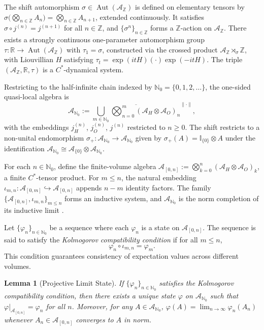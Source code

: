\documentclass[12pt,a4paper]{article}
\newtheorem{lemma}[theorem]{Lemma}
\begin{document}
The shift automorphism $\sigma \in \operatorname{Aut}(\mathcal{A}_{\mathbb{Z}})$ is defined on elementary tensors by $\sigma\big( \bigotimes_{n \in \mathbb{Z}} A_n \big) = \bigotimes_{n \in \mathbb{Z}} A_{n+1}$, extended continuously. It satisfies $\sigma \circ j^{(n)} = j^{(n+1)}$ for all $n \in \mathbb{Z}$, and $\{\sigma^n\}_{n \in \mathbb{Z}}$ forms a $\mathbb{Z}$-action on $\mathcal{A}_{\mathbb{Z}}$. There exists a strongly continuous one-parameter automorphism group $\tau: \mathbb{R} \to \operatorname{Aut}(\mathcal{A}_{\mathbb{Z}})$ with $\tau_1 = \sigma$, constructed via the crossed product $\mathcal{A}_{\mathbb{Z}} \rtimes_\sigma \mathbb{Z}$, with Liouvillian $H$ satisfying $\tau_t = \exp(i t H) (\cdot) \exp(-i t H)$. The triple $(\mathcal{A}_{\mathbb{Z}}, \mathbb{R}, \tau)$ is a $C^*$-dynamical system.

Restricting to the half-infinite chain indexed by $\mathbb{N}_0 = \{0,1,2,\dots\}$, the one-sided quasi-local algebra is
\[
\mathcal{A}_{\mathbb{N}_0} := \overline{\bigcup_{m \in \mathbb{N}_0} \bigotimes_{n=0}^m (\mathcal{A}_H \otimes \mathcal{A}_O)_n}^{\|\cdot\|},
\]
with the embeddings $j_H^{(n)}$, $j_O^{(n)}$, $j^{(n)}$ restricted to $n \ge 0$. The shift restricts to a non-unital endomorphism $\sigma_+: \mathcal{A}_{\mathbb{N}_0} \to \mathcal{A}_{\mathbb{N}_0}$ given by $\sigma_+(A) = \mathbb{I}_{\{0\}} \otimes A$ under the identification $\mathcal{A}_{\mathbb{N}_0} \cong \mathcal{A}_{\{0\}} \otimes \mathcal{A}_{\mathbb{N}_0}$.

For each $n \in \mathbb{N}_0$, define the finite-volume algebra $\mathcal{A}_{[0,n]} := \bigotimes_{k=0}^n (\mathcal{A}_H \otimes \mathcal{A}_O)_k$, a finite $C^*$-tensor product. For $m \le n$, the natural embedding $\iota_{m,n}: \mathcal{A}_{[0,m]} \hookrightarrow \mathcal{A}_{[0,n]}$ appends $n-m$ identity factors. The family $\{\mathcal{A}_{[0,n]}, \iota_{m,n}\}_{m \le n}$ forms an inductive system, and $\mathcal{A}_{\mathbb{N}_0}$ is the norm completion of its inductive limit \cite{OP87, Partha12}.

Let $\{\varphi_n\}_{n \in \mathbb{N}_0}$ be a sequence where each $\varphi_n$ is a state on $\mathcal{A}_{[0,n]}$. The sequence is said to satisfy the \textit{Kolmogorov compatibility condition} if for all $m \le n$,
\[
\varphi_n \circ \iota_{m,n} = \varphi_m.
\]
This condition guarantees consistency of expectation values across different volumes.

\begin{lemma}[Projective Limit State]
If $\{\varphi_n\}_{n \in \mathbb{N}_0}$ satisfies the Kolmogorov compatibility condition, then there exists a unique state $\varphi$ on $\mathcal{A}_{\mathbb{N}_0}$ such that $\varphi|_{\mathcal{A}_{[0,n]}} = \varphi_n$ for all $n$. Moreover, for any $A \in \mathcal{A}_{\mathbb{N}_0}$, $\varphi(A) = \lim_{n \to \infty} \varphi_n(A_n)$ whenever $A_n \in \mathcal{A}_{[0,n]}$ converges to $A$ in norm.
\end{lemma}
\end{document}
